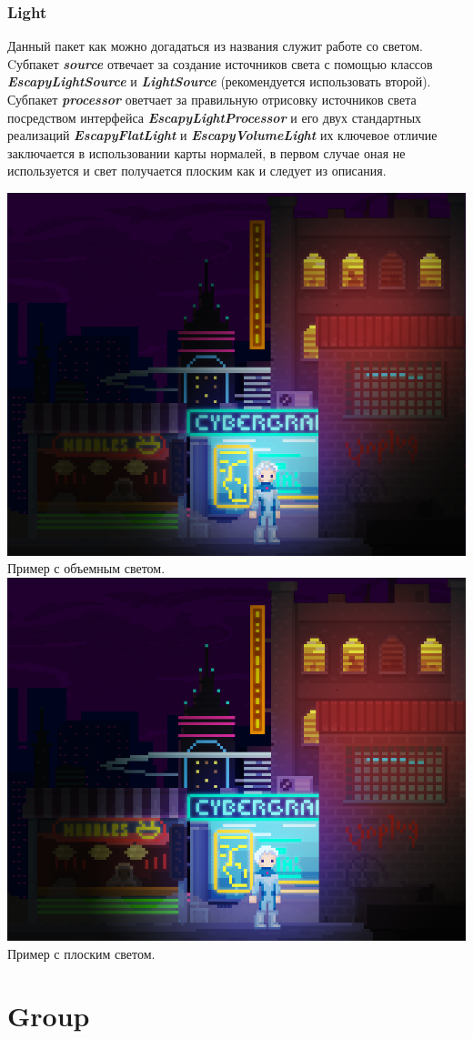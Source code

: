 \documentclass[11pt]{report}
\begin{document}
\subsection{Light}
Данный пакет как можно догадаться из названия служит работе со светом. 
\\Cубпакет \textit{\textbf{source}} отвечает за создание источников света с помощью классов  \textit{\textbf{EscapyLightSource}} и \textit{\textbf{LightSource}} (рекомендуется использовать второй). Субпакет \textit{\textbf{processor}} оветчает за правильную отрисовку источников света посредством интерфейса \textit{\textbf{EscapyLightProcessor}} и его двух стандартных реализаций \textit{\textbf{EscapyFlatLight}} и \textit{\textbf{EscapyVolumeLight}} их ключевое отличие заключается в использовании карты нормалей, в первом случае оная не используется и свет получается плоским как и следует из описания.
\begin{center}
	\includegraphics[width=1\linewidth]{img/10.png}
	Пример с объемным светом.
	\includegraphics[width=1\linewidth]{img/11.png}  
	Пример с плоским светом.
  	\label{img:1011} 
\end{center}

\chapter{Group}
\end{document}
